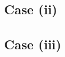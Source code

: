 \documentclass[10pt, a4paper, twoside]{basestyle}
\begin{document}
\subsection*{Case (ii)}
\subsection*{Case (iii)}

\printbibliography
\end{document}
